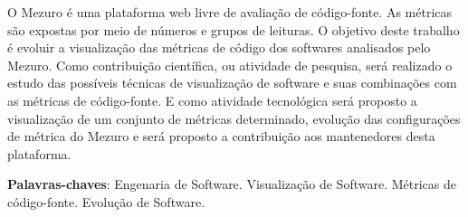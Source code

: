 \begin{resumo}
 O Mezuro é uma plataforma web livre de avaliação de código-fonte.
 As métricas são expostas por meio de números e grupos de leituras.
 O objetivo deste trabalho é evoluir a visualização das métricas de
 código dos softwares analisados pelo Mezuro. Como contribuição científica,
 ou atividade de pesquisa, será realizado o estudo das possíveis técnicas
 de visualização de software e suas combinações com as métricas de
 código-fonte. E como atividade tecnológica será proposto a visualização
 de um conjunto de métricas determinado, evolução das configurações de
 métrica do Mezuro e será proposto a contribuição aos mantenedores desta
 plataforma.

 \vspace{\onelineskip}
    
 \noindent
 \textbf{Palavras-chaves}: Engenaria de Software. Visualização de Software.
 Métricas de código-fonte. Evolução de Software.
\end{resumo}
